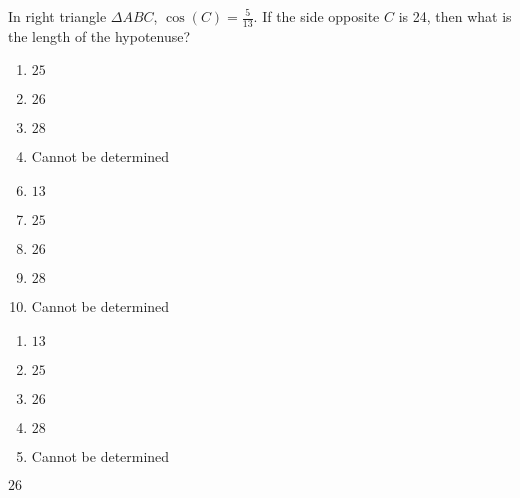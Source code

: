 

  In right triangle $\Delta ABC$, $\cos(C)=\frac{5}{13}$. If the side opposite $C$ is 24, then what is the length of the hypotenuse?


\ifsat
	\begin{enumerate}[label=\Alph*)]
		\item  $25$ 
		\item $26$ %
		\item $28$
		\item  Cannot be determined 
	\end{enumerate}
\else
\fi

\ifacteven
	\begin{enumerate}[label=\textbf{\Alph*.},itemsep=\fill,align=left]
		\setcounter{enumii}{5}
		\item    $13$
		\item  $25$ 
		\item $26$ %
		\addtocounter{enumii}{1}
		\item $28$
		\item  Cannot be determined 
	\end{enumerate}
\else
\fi

\ifactodd
	\begin{enumerate}[label=\textbf{\Alph*.},itemsep=\fill,align=left]
		\item    $13$
		\item  $25$ 
		\item $26$ %
		\item $28$
		\item  Cannot be determined 
	\end{enumerate}
\else
\fi

\ifgridin
 $26$ %
		
\else
\fi

